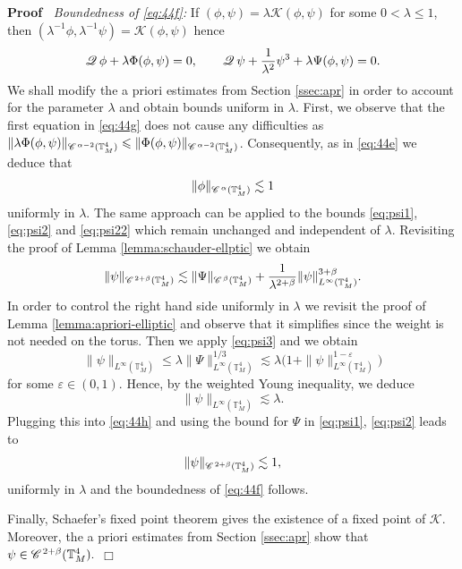 \documentclass[a4paper,11pt]{article}
\newenvironment{proof}{\noindent\textbf{Proof\ }}{\hspace*{\fill}$\Box$\medskip}
\numberwithin{equation}{section}
\newcommand{\CC}{\mathscr{C} \hspace{.1em}}
\newcommand{\Q}{\mathscr{Q} \hspace{.2em}}
\newcommand{\8}{\infty}
\begin{document}
\begin{proof}
\emph{Boundedness of \eqref{eq:44f}:}  If $(\phi,\psi)=\lambda\mathcal{K}(\phi,\psi) $ for some $0< \lambda\leqslant 1$, then $(\lambda^{-1}\phi,\lambda^{-1}\psi)=\mathcal{K}(\phi,\psi) $ hence
\begin{equation}\label{eq:44g}
\Q \phi + \lambda \Phi(\phi,\psi) = 0, \qquad \Q \psi + \frac{1}{\lambda^{2}}\psi^3 + \lambda\Psi(\phi,\psi) = 0.
\end{equation}
We shall modify the a priori estimates from Section \ref{ssec:apr} in order to account for the parameter $\lambda$ and obtain bounds uniform in $\lambda$. First, we observe that the first equation in \eqref{eq:44g} does not cause any difficulties as $\|\lambda\Phi(\phi,\psi)\|_{\CC^{\alpha-2}(\mathbb{T}_{M}^{4})}\leqslant \|\Phi(\phi,\psi)\|_{\CC^{\alpha-2}(\mathbb{T}_{M}^{4})}$. Consequently, as in  \eqref{eq:44e} we deduce that
$$
\|\phi\|_{\CC^{\alpha}(\mathbb{T}_{M}^{4})}\lesssim 1
$$
uniformly in $\lambda$. The same approach can be applied to the bounds \eqref{eq:psi1}, \eqref{eq:psi2} and \eqref{eq:psi22} which remain unchanged and independent of  $ \lambda$. Revisiting the proof of Lemma \ref{lemma:schauder-ellptic} we obtain
\begin{equation}\label{eq:44h}
\|\psi\|_{\CC^{2+\beta}(\mathbb{T}_{M}^{4})}\lesssim \|\Psi\|_{\CC^{\beta}(\mathbb{T}_{M}^{4})}+\frac{1}{\lambda^{2+\beta}}\|\psi\|_{L^{\infty}(\mathbb{T}_{M}^{4})}^{3+\beta}.
\end{equation}
In order to control the right hand side uniformly in $\lambda$ we revisit the proof of Lemma \ref{lemma:apriori-elliptic} and observe that it simplifies since the weight is not needed on the  torus. Then we apply  \eqref{eq:psi3} and we obtain
$$
\|\psi\|_{L^{\infty}(\mathbb{T}_{M}^{4})}\leqslant \lambda\|\Psi\|^{{1/3}}_{L^{\infty}(\mathbb{T}_{M}^{4})}\lesssim \lambda\big(1+\|\psi\|_{L^{\infty}(\mathbb{T}_{M}^{4})}^{1-\varepsilon}\big)
$$
for some $\varepsilon\in (0,1)$.
Hence, by the weighted Young inequality, we deduce
$$
\|\psi\|_{L^{\infty}(\mathbb{T}_{M}^{4})}\lesssim\lambda.
$$
Plugging this into \eqref{eq:44h} and using the bound for $\Psi$ in \eqref{eq:psi1}, \eqref{eq:psi2} leads to
$$
\|\psi\|_{\CC^{2+\beta}(\mathbb{T}_{M}^{4})}\lesssim 1,
$$
uniformly in $\lambda$ and the boundedness of \eqref{eq:44f} follows.

Finally, Schaefer's fixed point theorem \cite[Section 9.2.2, Theorem 4]{E98} gives the existence of a fixed point of $\mathcal{K}$. Moreover, the a priori estimates from Section \ref{ssec:apr} show that $\psi\in \CC^{2+\beta}(\mathbb{T}^{4}_{M}).$
\end{proof}
\end{document}
